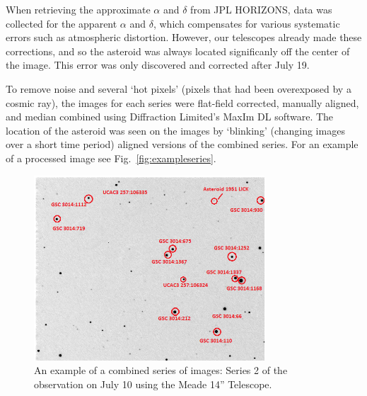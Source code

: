 \documentclass[11pt,a4paper]{article}
\begin{document}
When retrieving the approximate $\alpha$ and $\delta$ from JPL HORIZONS, data was collected for the apparent $\alpha$ and $\delta$, which compensates for various systematic errors such as atmospheric distortion.
However, our telescopes already made these corrections, and so the asteroid was always located significanly off the center of the image.
This error was only discovered and corrected after July 19. 

To remove noise and several `hot pixels' (pixels that had been overexposed by a cosmic ray), the images for each series were flat-field corrected, manually aligned, and median combined using Diffraction Limited's MaxIm DL software.
The location of the asteroid was seen on the images by `blinking' (changing images over a short time period) aligned versions of the combined series.
For an example of a processed image see Fig.~\ref{fig:exampleseries}.

\begin{figure}[!t]
\centering
\includegraphics[width=3.4in]{Jul10Series2.png}
\caption{An example of a combined series of images: Series 2 of the observation on July 10 using the Meade 14'' Telescope.\label{fig:exampleseries}}
\label{fig_sim}
\end{figure}
\end{document}
